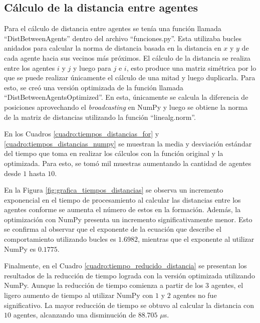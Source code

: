 \subsection{Cálculo de la distancia entre agentes}
Para el cálculo de distancia entre agentes se tenía una función llamada ``DistBetweenAgents'' dentro del archivo ``funciones.py''. Esta utilizaba bucles anidados para calcular la norma de distancia basada en la distancia en $x$ y $y$ de cada agente hacia sus vecinos más próximos. El cálculo de la distancia se realiza entre los agentes $i$ y $j$ y luego para $j$ e $i$, esto produce una matriz simétrica por lo que se puede realizar únicamente el cálculo de una mitad y luego duplicarla. Para esto, se creó una versión optimizada de la función llamada ``DistBetweenAgentsOptimized''. En esta, únicamente se calcula la diferencia de posiciones aprovechando el \textit{broadcasting} en NumPy y luego se obtiene la norma de la matriz de distancias utilizando la función ``linealg.norm''.

En los Cuadros \ref{cuadro:tiempos_distancias_for} y \ref{cuadro:tiempos_distancias_numpy} se muestran la media y desviación estándar del tiempo que toma en realizar los cálculos con la función original y la optimizada. Para esto, se tomó mil muestras aumentando la cantidad de agentes desde $1$ hasta $10$. 

En la Figura \ref{fig:grafica_tiempos_distancias} se observa un incremento exponencial en el tiempo de procesamiento al calcular las distancias entre los agentes conforme se aumenta el número de estos en la formación. Además, la optimización con NumPy presenta un incremento significativamente menor. Esto se confirma al observar que el exponente de la ecuación que describe el comportamiento utilizando bucles es $1.6982$, mientras que el exponente al utilizar NumPy es $0.1775$.

Finalmente, en el Cuadro \ref{cuadro:tiempo_reducido_distancia} se presentan los resultados de la reducción de tiempo lograda con la versión optimizada utilizando NumPy. Aunque la reducción de tiempo comienza a partir de los $3$ agentes, el ligero aumento de tiempo al utilizar NumPy con $1$ y $2$ agentes no fue significativo. La mayor reducción de tiempo se obtuvo al calcular la distancia con $10$ agentes, alcanzando una disminución de $88.705$ $\mu$s.


